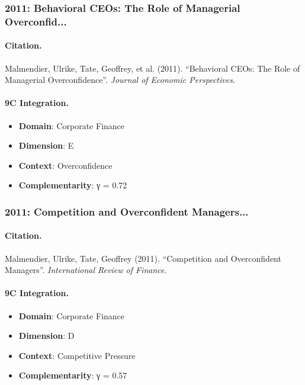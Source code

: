 \subsubsection{2011: Behavioral CEOs: The Role of Managerial Overconfid...}

\paragraph{Citation.}
Malmendier, Ulrike, Tate, Geoffrey, et al. (2011). ``Behavioral CEOs: The Role of Managerial Overconfidence''. \textit{Journal of Economic Perspectives}.

\paragraph{9C Integration.}
\begin{itemize}[nosep]
  \item \textbf{Domain}: Corporate Finance
  \item \textbf{Dimension}: E
  \item \textbf{Context}: Overconfidence
  \item \textbf{Complementarity}: γ = 0.72
\end{itemize}


\subsubsection{2011: Competition and Overconfident Managers...}

\paragraph{Citation.}
Malmendier, Ulrike, Tate, Geoffrey (2011). ``Competition and Overconfident Managers''. \textit{International Review of Finance}.

\paragraph{9C Integration.}
\begin{itemize}[nosep]
  \item \textbf{Domain}: Corporate Finance
  \item \textbf{Dimension}: D
  \item \textbf{Context}: Competitive Pressure
  \item \textbf{Complementarity}: γ = 0.57
\end{itemize}


